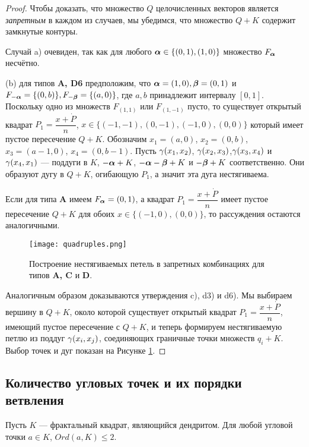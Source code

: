 \begin{proof} 
Чтобы доказать, что множество $Q$ целочисленных векторов является {\em запретным} в каждом из случаев, мы убедимся, что множество $Q+K$ содержит замкнутые контуры.

Случай a) очевиден, так как для любого ${\bm{\alpha}}\in\{(0,1),(1,0)\}$ множество $F_{\bm{\alpha}}$ несчётно.

(b) для типов {\bf A, D6} предположим, что ${\bm{\alpha}}=(1,0), {\bm{\beta}}=(0,1)$ и $F_{-{\bm{\alpha}}}=\{(0,b)\}, F_{-{\bm{\beta}}}=\{(a,0)\}$, где $a,b$ принадлежит интервалу $[0,1]$.
Поскольку одно из множеств $F_{(1,1)}$ или $F_{(1,-1)}$ пусто, то существует открытый квадрат $P_1=\dfrac{x+\dot P}{n}$, $x\in \{(-1,-1),(0,-1), (-1,0), (0,0)\}$ который имеет пустое пересечение $Q+K$. 
Обозначим $x_1=(a,0)$, 
$x_2=(0,b)$, $x_3=(a-1,0)$, $x_4=(0,b-1)$. 
Пусть $\gamma(x_1,x_2)$, $\gamma(x_2,x_3)$,$\gamma(x_3,x_4)$ и $\gamma(x_4,x_1)$ --- поддуги в $K$, $-{\bm{\alpha}}+K$, $-{\bm{\alpha}}-{\bm{\beta}}+K$ и $-{\bm{\beta}}+K$ соответственно.
Они образуют дугу в $Q+K$, огибающую $P_1$, а значит эта дуга нестягиваема. 

Если для типа {\bf A} имеем $F_{\bm{\alpha}}=(0,1)$, а квадрат $P_1=\dfrac{x+\dot P}{n}$ имеет пустое пересечение $Q+K$ для обоих $x\in\{(-1,0), (0,0)\}$, то рассуждения остаются аналогичными.

\begin{figure}[H]
    \centering
    \texttt{[image: quadruples.png]}
    \caption{Построение нестягиваемых петель в запретных комбинациях для типов {\bf A, C} и {\bf D}.}
    \label{forbid}
\end{figure}

Аналогичным образом доказываются утверждения c), d3) и d6).
Мы выбираем вершину в $Q+K$, около которой существует открытый квадрат $P_1=\dfrac{x+\dot P}{n}$, имеющий пустое пересечение с $Q+K$, и теперь формируем нестягиваемую петлю из поддуг $\gamma(x_i,x_j)$, соединяющих граничные точки множеств $q_i+K$.
Выбор точек и дуг показан на Рисунке \ref{forbid}.
\end{proof}


\subsection{Количество угловых точек и их порядки ветвления}

\begin{theorem}\label{thm:vertex_branching}
Пусть $K$ --- фрактальный квадрат, являющийся дендритом.
Для любой угловой точки $a\in K$,
 $Ord(a,K)\leq 2$.
\end{theorem}

